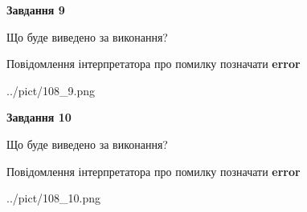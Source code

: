 \documentclass[12pt, ukrainian]{article}
\begin{document}
{{\begin {center}\textbf{Завдання 9}\end {center}}\par
Що буде виведено за виконання? \par
Повідомлення інтерпретатора про помилку позначати \textbf{error}

\begin{center}
	{../pict/108_9.png}
\end{center}
\newpage

{\begin {center}\textbf{Завдання 10}\end {center}}\par
Що буде виведено за виконання? \par
Повідомлення інтерпретатора про помилку позначати \textbf{error}

\begin{center}
	{../pict/108_10.png}
\end{center}
\newpage

}
\end{document}
